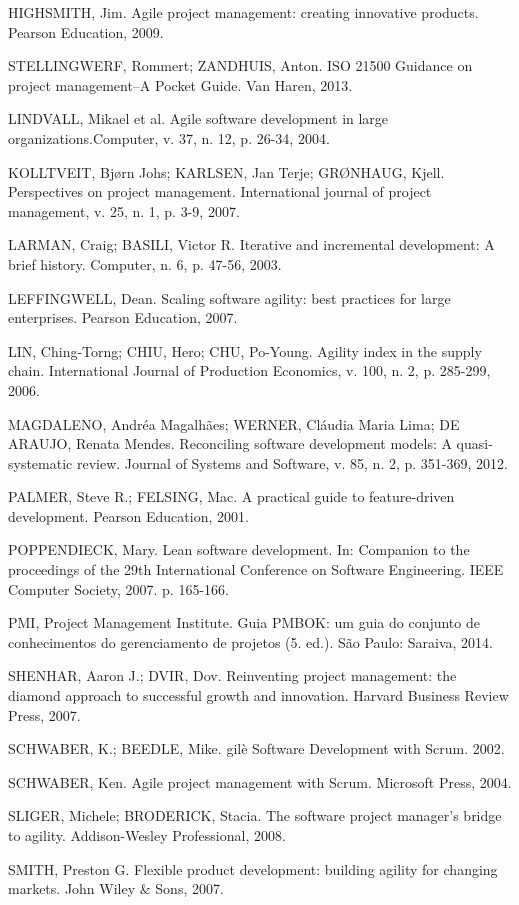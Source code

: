 HIGHSMITH, Jim. Agile project management: creating innovative products. Pearson Education, 2009.

STELLINGWERF, Rommert; ZANDHUIS, Anton. ISO 21500 Guidance on project management–A Pocket Guide. Van Haren, 2013.

LINDVALL, Mikael et al. Agile software development in large organizations.Computer, v. 37, n. 12, p. 26-34, 2004.

KOLLTVEIT, Bjørn Johs; KARLSEN, Jan Terje; GRØNHAUG, Kjell. Perspectives on project management. International journal of project management, v. 25, n. 1, p. 3-9, 2007.

LARMAN, Craig; BASILI, Victor R. Iterative and incremental development: A brief history. Computer, n. 6, p. 47-56, 2003.

LEFFINGWELL, Dean. Scaling software agility: best practices for large enterprises. Pearson Education, 2007.

LIN, Ching-Torng; CHIU, Hero; CHU, Po-Young. Agility index in the supply chain. International Journal of Production Economics, v. 100, n. 2, p. 285-299, 2006.

MAGDALENO, Andréa Magalhães; WERNER, Cláudia Maria Lima; DE ARAUJO, Renata Mendes. Reconciling software development models: A quasi-systematic review. Journal of Systems and Software, v. 85, n. 2, p. 351-369, 2012.

PALMER, Steve R.; FELSING, Mac. A practical guide to feature-driven development. Pearson Education, 2001.

POPPENDIECK, Mary. Lean software development. In: Companion to the proceedings of the 29th International Conference on Software Engineering. IEEE Computer Society, 2007. p. 165-166.

PMI, Project Management Institute. Guia PMBOK: um guia do conjunto de conhecimentos do gerenciamento de projetos (5. ed.). São Paulo:  Saraiva, 2014.

SHENHAR, Aaron J.; DVIR, Dov. Reinventing project management: the diamond approach to successful growth and innovation. Harvard Business Review Press, 2007.

SCHWABER, K.; BEEDLE, Mike. gilè Software Development with Scrum. 2002.

SCHWABER, Ken. Agile project management with Scrum. Microsoft Press, 2004.

SLIGER, Michele; BRODERICK, Stacia. The software project manager's bridge to agility. Addison-Wesley Professional, 2008.

SMITH, Preston G. Flexible product development: building agility for changing markets. John Wiley \& Sons, 2007.

